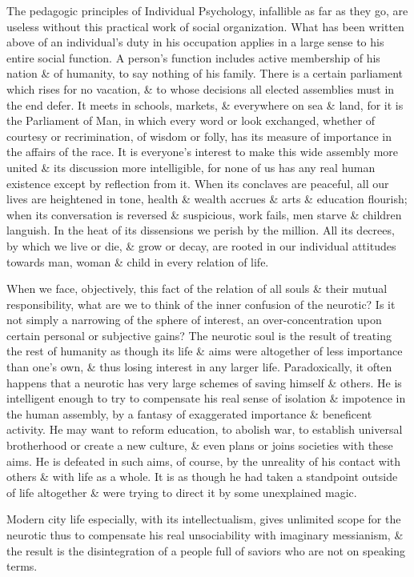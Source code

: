 \documentclass{article}
\begin{document}
The pedagogic principles of Individual Psychology, infallible as far as they go, are useless without this practical work of social organization. What has been written above of an individual's duty in his occupation applies in a large sense to his entire social function. A person's function includes active membership of his nation \& of humanity, to say nothing of his family. There is a certain parliament which rises for no vacation, \& to whose decisions all elected assemblies must in the end defer. It meets in schools, markets, \& everywhere on sea \& land, for it is the Parliament of Man, in which every word or look exchanged, whether of courtesy or recrimination, of wisdom or folly, has its measure of importance in the affairs of the race. It is everyone's interest to make this wide assembly more united \& its discussion more intelligible, for none of us has any real human existence except by reflection from it. When its conclaves are peaceful, all our lives are heightened in tone, health \& wealth accrues \& arts \& education flourish; when its conversation is reversed \& suspicious, work fails, men starve \& children languish. In the heat of its dissensions we perish by the million. All its decrees, by which we live or die, \& grow or decay, are rooted in our individual attitudes towards man, woman \& child in every relation of life.

When we face, objectively, this fact of the relation of all souls \& their mutual responsibility, what are we to think of the inner confusion of the neurotic? Is it not simply a narrowing of the sphere of interest, an over-concentration upon certain personal or subjective gains? The neurotic soul is the result of treating the rest of humanity as though its life \& aims were altogether of less importance than one's own, \& thus losing interest in any larger life. Paradoxically, it often happens that a neurotic has very large schemes of saving himself \& others. He is intelligent enough to try to compensate his real sense of isolation \& impotence in the human assembly, by a fantasy of exaggerated importance \& beneficent activity. He may want to reform education, to abolish war, to establish universal brotherhood or create a new culture, \& even plans or joins societies with these aims. He is defeated in such aims, of course, by the unreality of his contact with others \& with life as a whole. It is as though he had taken a standpoint outside of life altogether \& were trying to direct it by some unexplained magic.

Modern city life especially, with its intellectualism, gives unlimited scope for the neurotic thus to compensate his real unsociability with imaginary messianism, \& the result is the disintegration of a people full of saviors who are not on speaking terms.
\end{document}
